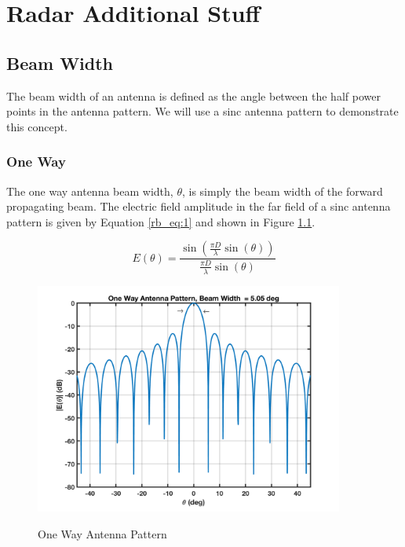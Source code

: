 \renewcommand{\baselinestretch}{2} \small\normalsize
\chapter{Radar Additional Stuff}

\section{Beam Width}
The beam width of an antenna is defined as the angle between the half power points in the antenna pattern. We will use a sinc antenna pattern to demonstrate this concept.

\subsection{One Way}
The one way antenna beam width, $\theta$, is simply the beam width of the forward propagating beam. The electric field amplitude in the far field of a sinc antenna pattern is given by Equation \ref{rb_eq:1} and shown in Figure \ref{rb_fig:4}.

\begin{equation}
\label{rb_eq:1}
E(\theta) = \frac{\sin\left(\frac{\pi D}{\lambda}\sin(\theta) \right)}{\frac{\pi D}{\lambda}\sin(\theta)}
\end{equation}

\begin{figure}[H]
  \begin{center}
\includegraphics[width=4in]{../media/multistatic/sinc_antenna_pattern_one_way.png}
  \end{center}
  \renewcommand{\baselinestretch}{1} \small\normalsize
  \begin{quote}
    \caption[One Way Antenna Pattern]{One Way Antenna Pattern\label{rb_fig:4}}
  \end{quote}
\end{figure}
\renewcommand{\baselinestretch}{2} \small\normalsize

